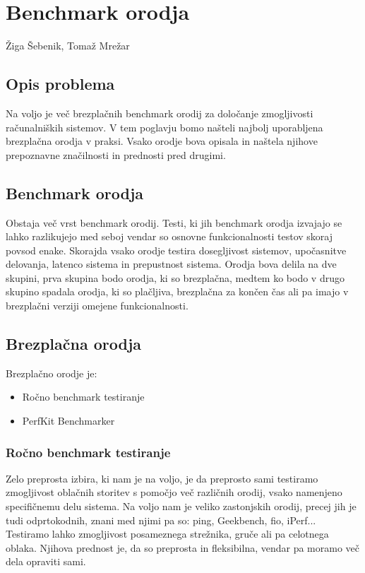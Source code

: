 \chapter[Benchmark orodja]{Benchmark orodja}

\pagestyle{fancy}
\fancyhf{}
\fancyhead[LE,RO]{\thepage}
\fancyhead[RE,LO]{\leftmark}

\huge Žiga Šebenik, Tomaž Mrežar
\normalsize
\bigskip

\section{Opis problema}
Na voljo je več brezplačnih benchmark orodij za določanje zmogljivosti računalniških sistemov. V tem poglavju bomo našteli najbolj uporabljena brezplačna orodja v praksi.
Vsako orodje bova opisala in naštela njihove prepoznavne značilnosti in prednosti pred drugimi.
  


\section{Benchmark orodja}
Obstaja več vrst benchmark orodij. Testi, ki jih benchmark orodja izvajajo se lahko razlikujejo med seboj vendar so osnovne funkcionalnosti testov skoraj povsod enake. Skorajda vsako orodje testira dosegljivost sistemov, upočasnitve delovanja, latenco sistema in prepustnost sistema. Orodja bova delila na dve skupini, prva skupina bodo orodja, ki so brezplačna, medtem ko bodo v drugo skupino spadala orodja, ki so plačljiva, brezplačna za končen čas ali pa imajo v brezplačni verziji omejene funkcionalnosti.

\section{Brezplačna orodja}
Brezplačno orodje je:
\begin{itemize}
\item Ročno benchmark testiranje
\item PerfKit Benchmarker
\end{itemize}

\subsection{Ročno benchmark testiranje}
Zelo preprosta izbira, ki nam je na voljo, je da preprosto sami testiramo zmogljivost oblačnih storitev s pomočjo več različnih orodij, vsako namenjeno specifičnemu delu sistema. Na voljo nam je veliko zastonjskih orodij, precej jih je tudi odprtokodnih, znani med njimi pa so: ping, Geekbench, fio, iPerf... Testiramo lahko zmogljivost posameznega strežnika, gruče ali pa celotnega oblaka. Njihova prednost je, da so preprosta in fleksibilna, vendar pa moramo več dela opraviti sami.

